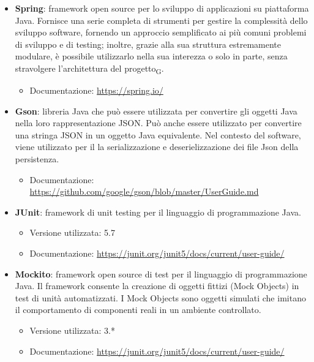 \begin{itemize}
	\item \textbf{Spring}: framework open source per lo sviluppo di applicazioni su piattaforma Java. Fornisce una serie completa di strumenti per gestire la complessità dello sviluppo software, fornendo un approccio semplificato ai più comuni problemi di sviluppo e di testing; inoltre, grazie alla sua struttura estremamente modulare, è possibile utilizzarlo nella sua interezza o solo in parte, senza stravolgere l’architettura del progetto\textsubscript{G}.
	\begin{itemize}
		\item Documentazione: \url{https://spring.io/}
	\end{itemize}
	\item \textbf{Gson}: libreria Java che può essere utilizzata per convertire gli oggetti Java nella loro rappresentazione JSON. Può anche essere utilizzato per convertire una stringa JSON in un oggetto Java equivalente. Nel contesto del software, viene utilizzato per il la serializzazione e deserielizzazione dei file Json della persistenza.
	\begin{itemize}
	\item Documentazione: \url{https://github.com/google/gson/blob/master/UserGuide.md}
	\end{itemize}
	\item \textbf{JUnit}: framework di unit testing per il linguaggio di programmazione Java.
	\begin{itemize}
		\item Versione utilizzata: 5.7
		\item Documentazione: \url{https://junit.org/junit5/docs/current/user-guide/}
	\end{itemize}

	\item \textbf{Mockito}: framework open source di test per il linguaggio di programmazione Java. Il framework consente la creazione di oggetti fittizi (Mock Objects) in test di unità automatizzati. I Mock Objects sono oggetti simulati che imitano il comportamento di componenti reali in un ambiente controllato.
		\begin{itemize}
		\item Versione utilizzata: 3.*
		\item Documentazione: \url{https://junit.org/junit5/docs/current/user-guide/}
	\end{itemize}

\end{itemize}